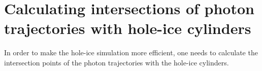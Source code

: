 
\section{Calculating intersections of photon trajectories with hole-ice cylinders}

In order to make the hole-ice simulation more efficient, one needs to calculate the intersection points of the photon trajectories with the hole-ice cylinders.

\lipsum

